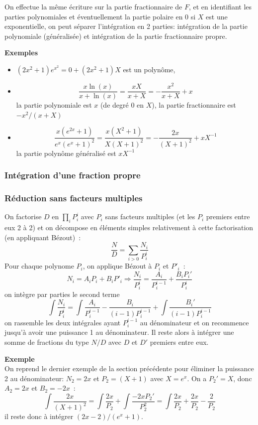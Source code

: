 \documentclass[a4paper,11pt]{article}
\begin{document}
\begin{giacjshere}
On effectue la même écriture sur la partie fractionnaire de $F$,
et en identifiant les parties polynomiales et éventuellement la partie
polaire en 0 si $X$ est une exponentielle, on peut séparer l'intégration
en 2 parties: intégration de la partie polynomiale (généralisée)
et intégration de la partie fractionnaire propre.

{\bf Exemples}
\begin{itemize}
\item $ (2x^2+1) e^{x^2} = 0+(2x^2+1)X$ est un polynôme,
\item 
\[ \frac{x \ln(x)}{x+\ln(x)} = \frac{xX}{x+X}=-\frac{x^2}{x+X}+x\]
la partie polynomiale est $x$ (de degré 0 en $X$), la partie fractionnaire
est $-x^2/(x+X)$
\item 
\[ \frac{x(e^{2x}+1)}{e^x(e^x+1)^2}=\frac{x(X^2+1)}{X(X+1)^2}
= -\frac{2x}{(X+1)^2} + xX^{-1}\]
la partie polynôme généralisé est $xX^{-1}$
\end{itemize}

\subsubsection{Intégration d'une fraction propre}
\subsubsection{Réduction sans facteurs multiples}
On factorise $D$ en $\prod_i P_i^i$ avec $P_i$ sans facteurs multiples 
(et les $P_i$ premiers entre eux 2 \`a 2) et on décompose
en éléments simples relativement à cette factorisation (en appliquant
Bézout)~:
\[ \frac{N}{D} = \sum_{i>0} \frac{N_i}{P_i^i} \]
Pour chaque polynome $P_i$, on applique Bézout à $P_i$ et $P'_i$~:
\[ N_i = A_iP_i+B_iP'_i \Rightarrow \frac{N_i}{P_i^i}=\frac{A_i}{P_i^{i-1}}
+ \frac{B_iP_i'}{P_i^i}\]
on intègre par parties le second terme
\[ \int \frac{N_i}{P_i^i} = \int \frac{A_i}{P_i^{i-1}}
- \frac{B_i}{(i-1)P_i^{i-1}} + \int \frac{B_i'}{(i-1)P_i^{i-1}}  \]
on rassemble les deux int\'egrales ayant $P_i^{i-1}$ au dénominateur
et on recommence jusqu'à avoir une puissance 1 au dénominateur. Il reste
alors \`a int\'egrer une somme de fractions du type $N/D$ avec
$D$ et $D'$ premiers entre eux.

{\bf Exemple}\\
On reprend le dernier exemple de la section précédente pour
éliminer la puissance 2 au dénominateur:
$N_2=2x$ et $P_2=(X+1)$ avec $X=e^x$. On a $P_2'=X$, donc $A_2=2x$ et
$B_2=-2x$~:
\[ \int \frac{2x}{(X+1)^2} =\int \frac{2x}{P_2} + 
\int \frac{-2x P_2'}{P_2^2} = \int \frac{2x}{P_2} + \frac{2x}{P_2}
- \frac{2}{P_2}\]
il reste donc à intégrer $(2x-2)/(e^x+1)$.


\end{giacjshere}
\end{document}
